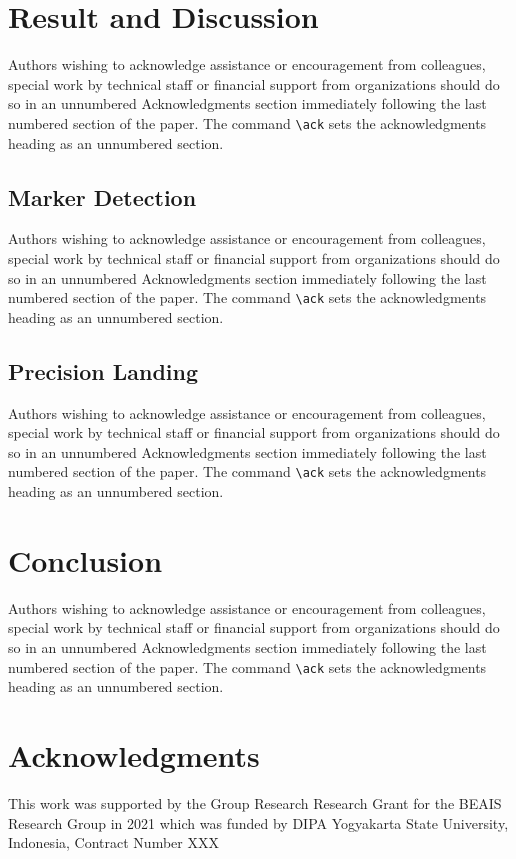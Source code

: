 \documentclass[a4paper]{jpconf}
\begin{document}
\section{Result and Discussion}
Authors wishing to acknowledge assistance or encouragement from
colleagues, special work by technical staff or financial support from
organizations should do so in an unnumbered Acknowledgments section
immediately following the last numbered section of the paper. The
command \verb"\ack" sets the acknowledgments heading as an unnumbered
section.

\subsection{Marker Detection}
Authors wishing to acknowledge assistance or encouragement from
colleagues, special work by technical staff or financial support from
organizations should do so in an unnumbered Acknowledgments section
immediately following the last numbered section of the paper. The
command \verb"\ack" sets the acknowledgments heading as an unnumbered
section.

\subsection{Precision Landing}
Authors wishing to acknowledge assistance or encouragement from
colleagues, special work by technical staff or financial support from
organizations should do so in an unnumbered Acknowledgments section
immediately following the last numbered section of the paper. The
command \verb"\ack" sets the acknowledgments heading as an unnumbered
section.

\section{Conclusion}
Authors wishing to acknowledge assistance or encouragement from
colleagues, special work by technical staff or financial support from
organizations should do so in an unnumbered Acknowledgments section
immediately following the last numbered section of the paper. The
command \verb"\ack" sets the acknowledgments heading as an unnumbered
section.

\section*{Acknowledgments}
This work was supported by the Group Research Research Grant for the BEAIS Research Group in 2021 which was funded by DIPA Yogyakarta State University, Indonesia, Contract Number XXX
\end{document}
